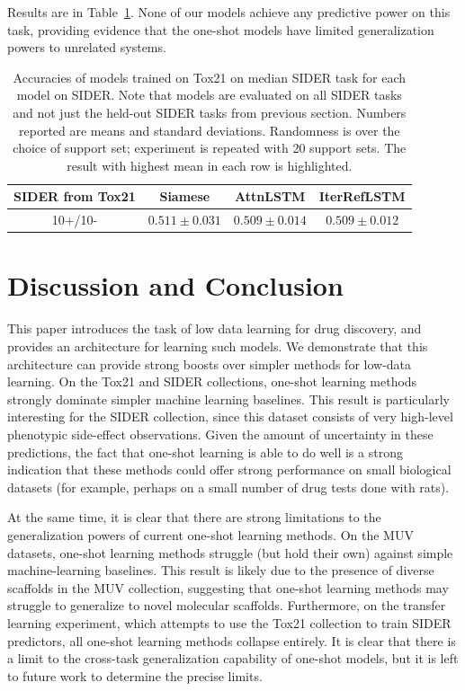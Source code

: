 \documentclass[journal=jacsat,manuscript=article]{achemso}
\begin{document}
Results are in Table~\ref{tab:transfer}. None of our models achieve any predictive power on this task, providing evidence that the one-shot models have limited generalization powers to unrelated systems.

\begin{table}
    \centering
    \begin{tabular}{ |c|c|c|c| } 
    \hline
    SIDER from Tox21 & Siamese & AttnLSTM & IterRefLSTM \\ 
    \hline
    10+/10- & $0.511 \pm 0.031$ & $0.509 \pm 0.014$ & $0.509 \pm 0.012$ \\
    \hline
    \end{tabular}
    \caption{Accuracies of models trained on Tox21 on median SIDER task for each model on SIDER. Note that models are evaluated on all SIDER tasks and not just the held-out SIDER tasks from previous section. Numbers reported are means and standard deviations. Randomness is over the choice of support set; experiment is repeated with 20 support sets. The result with highest mean in each row is highlighted.}
    \label{tab:transfer}
\end{table}

\section{Discussion and Conclusion}

This paper introduces the task of low data learning for drug discovery, and provides an architecture for learning such models. We demonstrate that this architecture can provide strong boosts over simpler methods for low-data learning. On the Tox21 and SIDER collections, one-shot learning methods strongly dominate simpler machine learning baselines. This result is particularly interesting for the SIDER collection, since this dataset consists of very high-level phenotypic side-effect observations. Given the amount of uncertainty in these predictions, the fact that one-shot learning is able to do well is a strong indication that these methods could offer strong performance on small biological datasets (for example, perhaps on a small number of drug tests done with rats).

At the same time, it is clear that there are strong limitations to the generalization powers of current one-shot learning methods. On the MUV datasets, one-shot learning methods struggle (but hold their own) against simple machine-learning baselines. This result is likely due to the presence of diverse scaffolds in the MUV collection, suggesting that one-shot learning methods may struggle to generalize to novel molecular scaffolds. Furthermore, on the transfer learning experiment, which attempts to use the Tox21 collection to train SIDER predictors, all one-shot learning methods collapse entirely. It is clear that there is a limit to the cross-task generalization capability of one-shot models, but it is left to future work to determine the precise limits.
\end{document}
